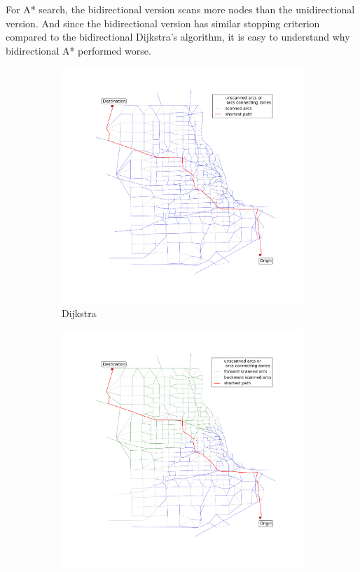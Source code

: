For A* search,
the bidirectional version scans more nodes than the unidirectional version.
And since the bidirectional version has similar stopping criterion compared to the bidirectional Dijkstra's algorithm,
it is easy to understand why bidirectional A* performed worse.

\begin{figure}
    \centering
    \begin{subfigure}{.5\textwidth}
        \centering
        \includegraphics[width=\textwidth,trim=120px 120px 48px 120px,clip]{img/chicago_dijkstra}
        \caption{Dijkstra}
        \label{fig:chicago_dijkstra}
    \end{subfigure}%
    \begin{subfigure}{.5\textwidth}
        \centering
        \includegraphics[width=\textwidth,trim=120px 120px 48px 120px,clip]{img/chicago_bidirect}

\end{subfigure}
\end{figure}

